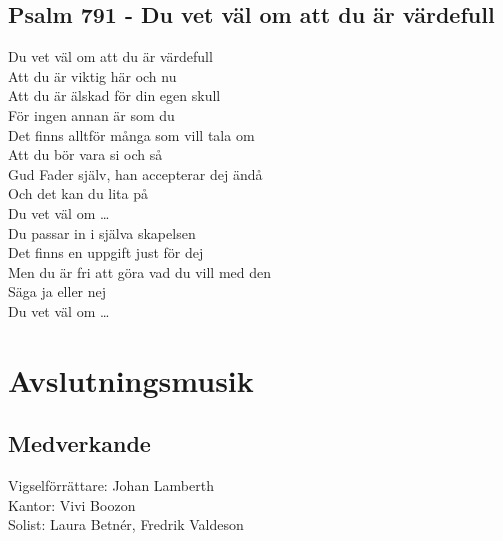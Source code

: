\documentclass[a5paper, 12pt]{article}
\begin{document}
\begin{center}
\begin{minipage}{\textwidth}
	\begin{center}
		\section{Psalm 791 - Du vet väl om att du är värdefull}
		Du vet väl om att du är värdefull   \\
		Att du är viktig här och nu         \\
		Att du är älskad för din egen skull \\
		För ingen annan är som du           \\
		\vspace{0.2cm}
		Det finns alltför många som vill tala om \\
		Att du bör vara si och så                \\ 
		Gud Fader själv, han accepterar dej ändå \\
		Och det kan du lita på                   \\
		\vspace{0.2cm} 
		Du vet väl om …                          \\
		\vspace{0.2cm}
		Du passar in i själva skapelsen            \\  
		Det finns en uppgift just för dej          \\ 
		Men du är fri att göra vad du vill med den \\ 
		Säga ja eller nej                          \\
		\vspace{0.2cm}   
		Du vet väl om …                            \\
	\end{center}
\end{minipage}
\vspace{0.4cm}

	\section{Avslutningsmusik}
\vspace{\fill} 

\begin{minipage}{\textwidth}
	\begin{center}
	\section{\hfil Medverkande \hfil}
	Vigselförrättare: Johan Lamberth \\
	Kantor: Vivi Boozon \\
	Solist: Laura Betnér, Fredrik Valdeson \\
	
	\end{center}
\end{minipage}
\end{center}
\end{document}
